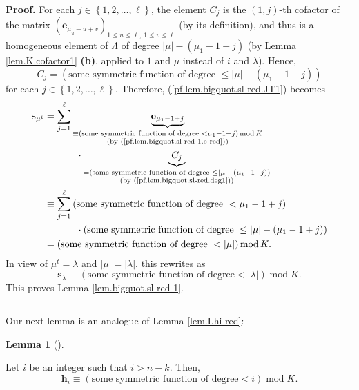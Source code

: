 \documentclass[numbers=enddot,12pt,final,onecolumn,notitlepage]{scrartcl}%
\theoremstyle{definition}
\newtheorem{lem}[theo]{Lemma}
\newenvironment{lemma}[1][]
{\begin{lem}[#1]\begin{leftbar}}
{\end{leftbar}\end{lem}}
\newenvironment{proof}[1][Proof]{\noindent\textbf{#1.} }{\ \rule{0.5em}{0.5em}}
\let\sumnonlimits\sum
\renewcommand{\sum}{\sumnonlimits\limits}
\begin{document}
\begin{proof}
For each $j\in\left\{  1,2,\ldots,\ell\right\}  $, the element $C_{j}$ is the
$\left(  1,j\right)  $-th cofactor of the matrix $\left(  \mathbf{e}_{\mu
_{u}-u+v}\right)  _{1\leq u\leq\ell,\ 1\leq v\leq\ell}$ (by its definition),
and thus is a homogeneous element of $\Lambda$ of degree $\left\vert
\mu\right\vert -\left(  \mu_{1}-1+j\right)  $ (by Lemma \ref{lem.K.cofactor1}
\textbf{(b)}, applied to $1$ and $\mu$ instead of $i$ and $\lambda$). Hence,%
\begin{equation}
C_{j}=\left(  \text{some symmetric function of degree }\leq\left\vert
\mu\right\vert -\left(  \mu_{1}-1+j\right)  \right)
\label{pf.lem.bigquot.sl-red.deg1}%
\end{equation}
for each $j\in\left\{  1,2,\ldots,\ell\right\}  $. Therefore,
(\ref{pf.lem.bigquot.sl-red.JT1}) becomes%
\begin{align*}
\mathbf{s}_{\mu^{t}}  &  =\sum_{j=1}^{\ell}\underbrace{\mathbf{e}_{\mu
_{1}-1+j}}_{\substack{\equiv\left(  \text{some symmetric function of degree
}<\mu_{1}-1+j\right)  \operatorname{mod}K\\\text{(by
(\ref{pf.lem.bigquot.sl-red-1.e-red})})}}\\
&  \ \ \ \ \ \ \ \ \ \ \cdot\underbrace{C_{j}}_{\substack{=\left(  \text{some
symmetric function of degree }\leq\left\vert \mu\right\vert -\left(  \mu
_{1}-1+j\right)  \right)  \\\text{(by (\ref{pf.lem.bigquot.sl-red.deg1}))}}}\\
&  \equiv\sum_{j=1}^{\ell}\left(  \text{some symmetric function of degree
}<\mu_{1}-1+j\right) \\
&  \ \ \ \ \ \ \ \ \ \ \cdot\left(  \text{some symmetric function of degree
}\leq\left\vert \mu\right\vert -\left(  \mu_{1}-1+j\right)  \right) \\
&  =\left(  \text{some symmetric function of degree }<\left\vert
\mu\right\vert \right)  \operatorname{mod}K.
\end{align*}
In view of $\mu^{t}=\lambda$ and $\left\vert \mu\right\vert =\left\vert
\lambda\right\vert $, this rewrites as%
\[
\mathbf{s}_{\lambda}\equiv\left(  \text{some symmetric function of degree
}<\left\vert \lambda\right\vert \right)  \operatorname{mod}K.
\]
This proves Lemma \ref{lem.bigquot.sl-red-1}.
\end{proof}

Our next lemma is an analogue of Lemma \ref{lem.I.hi-red}:

\begin{lemma}
\label{lem.bigquot.hi-red}Let $i$ be an integer such that $i>n-k$. Then,%
\[
\mathbf{h}_{i}\equiv\left(  \text{some symmetric function of degree
}<i\right)  \operatorname{mod}K.
\]

\end{lemma}
\end{document}
